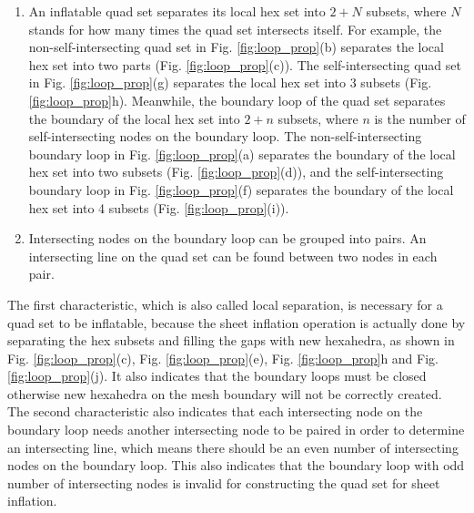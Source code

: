 \documentclass[final,5p,times,twocolumn]{elsarticle}
\begin{document}
\begin{enumerate}
\item An inflatable quad set separates its local hex set into $2+N$ subsets, where $N$ stands for how many times the quad set intersects itself. For example, the non-self-intersecting quad set in Fig. \ref{fig:loop_prop}(b) separates the local hex set into two parts (Fig. \ref{fig:loop_prop}(c)). The self-intersecting quad set in Fig. \ref{fig:loop_prop}(g) separates the local hex set into 3 subsets (Fig. \ref{fig:loop_prop}h). Meanwhile, the boundary loop of the quad set separates the boundary of the local hex set into $2+n$ subsets, where $n$ is the number of self-intersecting nodes on the boundary loop. The non-self-intersecting boundary loop in Fig. \ref{fig:loop_prop}(a) separates the boundary of the local hex set into two subsets (Fig. \ref{fig:loop_prop}(d)), and the self-intersecting boundary loop in Fig. \ref{fig:loop_prop}(f) separates the boundary of the local hex set into 4 subsets (Fig. \ref{fig:loop_prop}(i)).

\item Intersecting nodes on the boundary loop can be grouped into pairs. An intersecting line on the quad set can be found between two nodes in each pair.
\end{enumerate}

The first characteristic, which is also called local separation, is necessary for a quad set to be inflatable, because the sheet inflation operation is actually done by separating the hex subsets and filling the gaps with new hexahedra, as shown in Fig. \ref{fig:loop_prop}(c), Fig. \ref{fig:loop_prop}(e), Fig. \ref{fig:loop_prop}h and Fig. \ref{fig:loop_prop}(j). It also indicates that the boundary loops must be closed otherwise new hexahedra on the mesh boundary will not be correctly created. The second characteristic also indicates that each intersecting node on the boundary loop needs another intersecting node to be paired in order to determine an intersecting line, which means there should be an even number of intersecting nodes on the boundary loop. This also indicates that  the boundary loop with odd number of intersecting nodes is invalid for constructing the quad set for sheet inflation.
\end{document}
